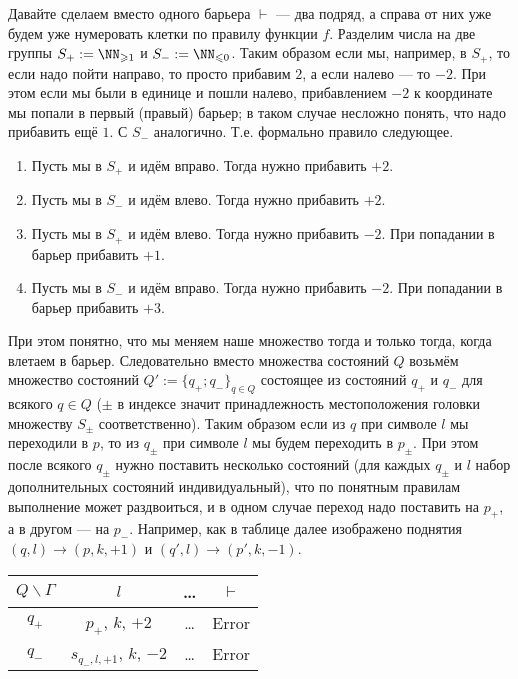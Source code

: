 \documentclass[12pt,a4paper]{article}
\begin{document}
\begin{enumproblem}
        Давайте сделаем вместо одного барьера $\vdash$ --- два подряд, а справа от них уже будем уже нумеровать клетки по правилу функции $f$. Разделим числа на две группы $S_+ := \NN_{\geqslant 1}$ и $S_- := \NN_{\leqslant 0}$. Таким образом если мы, например, в $S_+$, то если надо пойти направо, то просто прибавим $2$, а если налево --- то $-2$. При этом если мы были в единице и пошли налево, прибавлением $-2$ к координате мы попали в первый (правый) барьер; в таком случае несложно понять, что надо прибавить ещё $1$. С $S_-$ аналогично. Т.е. формально правило следующее.
        \begin{enumerate}
            \item Пусть мы в $S_+$ и идём вправо. Тогда нужно прибавить $+2$.
            \item Пусть мы в $S_-$ и идём влево. Тогда нужно прибавить $+2$.
            \item Пусть мы в $S_+$ и идём влево. Тогда нужно прибавить $-2$. При попадании в барьер прибавить $+1$.
            \item Пусть мы в $S_-$ и идём вправо. Тогда нужно прибавить $-2$. При попадании в барьер прибавить $+3$.
        \end{enumerate}
        При этом понятно, что мы меняем наше множество тогда и только тогда, когда влетаем в барьер. Следовательно вместо множества состояний $Q$ возьмём множество состояний $Q' := \{q_+; q_-\}_{q \in Q}$ состоящее из состояний $q_+$ и $q_-$ для всякого $q \in Q$ ($\pm$ в индексе значит принадлежность местоположения головки множеству $S_\pm$ соответственно). Таким образом если из $q$ при символе $l$ мы переходили в $p$, то из $q_\pm$ при символе $l$ мы будем переходить в $p_\pm$. При этом после всякого $q_\pm$ нужно поставить несколько состояний (для каждых $q_\pm$ и $l$ набор дополнительных состояний индивидуальный), что по понятным правилам выполнение может раздвоиться, и в одном случае переход надо поставить на $p_+$, а в другом --- на $p_-$. Например, как в таблице далее изображено поднятия $(q, l) \to (p, k, +1)$ и $(q', l) \to (p', k, -1)$.
        \begin{table}[H]
            \centering
            \begin{tabular}{c||c|c|c}
                $Q\backslash\Gamma$& $l$& \dots& $\vdash$\\
                \hline
                \hline
                $q_+$& $p_+$, $k$, $+2$& \dots& Error\\
                \hline
                \hline
                $q_-$& $s_{q_-, l, +1}$, $k$, $-2$& \dots& Error\\

\end{tabular}
\end{table}
\end{enumproblem}
\end{document}
